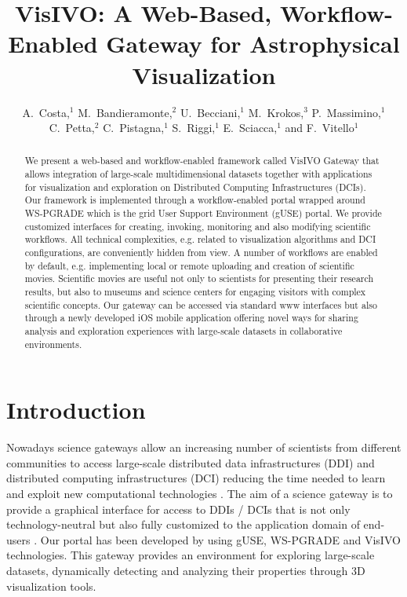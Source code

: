 
\resetcounters




\title{VisIVO: A Web-Based, Workflow-Enabled Gateway for Astrophysical Visualization}
\author{A.~Costa,$^1$ M.~Bandieramonte,$^2$ U.~Becciani,$^1$ M.~Krokos,$^3$ P.~Massimino,$^1$ C.~Petta,$^2$ C.~Pistagna,$^1$ S.~Riggi,$^1$ E.~Sciacca,$^1$ and F.~Vitello$^1$}


\begin{abstract}
We present a web-based and workflow-enabled framework called VisIVO Gateway that allows integration of large-scale multidimensional datasets together with applications for visualization and exploration on Distributed Computing Infrastructures (DCIs).
Our framework is implemented through a workflow-enabled portal wrapped around WS-PGRADE which is the grid User Support Environment (gUSE) portal.  We provide customized interfaces for creating, invoking, monitoring and also modifying scientific workflows. All technical complexities, e.g. related to visualization algorithms and DCI configurations, are conveniently hidden from view.
A number of workflows are enabled by default, e.g. implementing local or remote uploading and creation of scientific movies. Scientific movies are useful not only to scientists for presenting their research results, but also to museums and science centers for engaging visitors with complex scientific concepts.
Our gateway can be accessed via standard www interfaces but also through a newly developed iOS mobile application offering novel ways for sharing analysis and exploration experiences with large-scale datasets in collaborative environments.
\end{abstract}

\section{Introduction}
Nowadays science gateways allow an increasing number of scientists from different communities to access large-scale distributed data infrastructures (DDI) and distributed computing infrastructures (DCI) reducing the time needed to learn and exploit new computational technologies \citep{borkin2011visualization}. The aim of a science gateway is to provide a graphical interface for access to DDIs / DCIs that is not only technology-neutral but also fully customized to the application domain of end-users \citep{abt_1990}. Our portal has been developed by using gUSE, WS-PGRADE  \citep{kacsuk2011p}  and VisIVO \citep{becciani2010visivo} technologies. This gateway provides an environment for exploring large-scale datasets, dynamically detecting and analyzing their properties through 3D visualization tools. 

